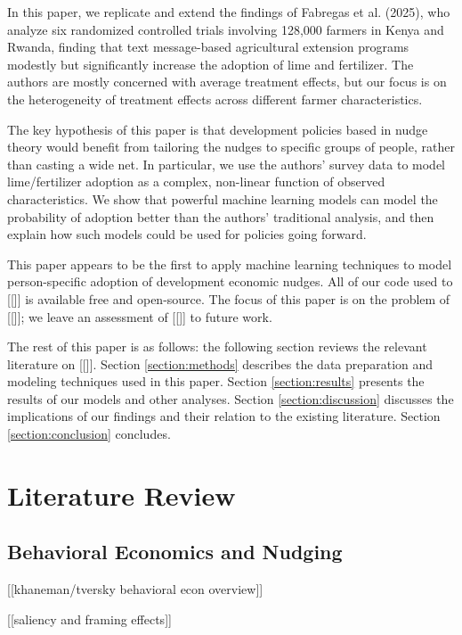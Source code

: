 \documentclass[12pt]{article}
\begin{document}
In this paper, we replicate and extend the findings of Fabregas et al. (2025), who analyze six randomized controlled trials involving 128,000 farmers in Kenya and Rwanda, finding that text message-based agricultural extension programs modestly but significantly increase the adoption of lime and fertilizer. The authors are mostly concerned with average treatment effects, but our focus is on the heterogeneity of treatment effects across different farmer characteristics.

The key hypothesis of this paper is that development policies based in nudge theory would benefit from tailoring the nudges to specific groups of people, rather than casting a wide net. In particular, we use the authors' survey data to model lime/fertilizer adoption as a complex, non-linear function of observed characteristics. We show that powerful machine learning models can model the probability of adoption better than the authors' traditional analysis, and then explain how such models could be used for policies going forward.

This paper appears to be the first to apply machine learning techniques to model person-specific adoption of development economic nudges. All of our code used to [[]] is available free and open-source. The focus of this paper is on the problem of [[]]; we leave an assessment of [[]] to future work.

The rest of this paper is as follows: the following section reviews the relevant literature on [[]]. Section \ref{section:methods} describes the data preparation and modeling techniques used in this paper. Section \ref{section:results} presents the results of our models and other analyses. Section \ref{section:discussion} discusses the implications of our findings and their relation to the existing literature. Section \ref{section:conclusion} concludes.

\section{Literature Review}
\label{section:litreview}

\subsection{Behavioral Economics and Nudging}
[[khaneman/tversky behavioral econ overview]]

[[saliency and framing effects]]
\end{document}
